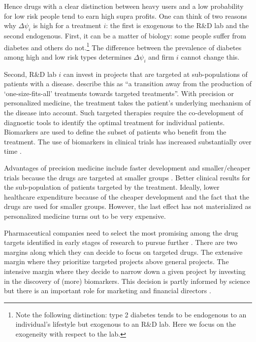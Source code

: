 \documentclass[a4paper,12pt]{article}
\begin{document}
Hence drugs with a clear distinction between heavy users and a low probability for low risk people tend to earn high supra profits. One can think of two reasons why \(\Delta \psi_i\) is high for a treatment \(i\): the first is exogenous to the R\&D lab and the second endogenous. First, it can be a matter of biology: some people suffer from diabetes and others do not.\footnote{Note the following distinction: type 2 diabetes tends to be endogenous to an individual's lifestyle but exogenous to an R\&D lab. Here we focus on the exogeneity with respect to the lab.} The difference between the prevalence of diabetes among high and low risk types determines \(\Delta \psi_i\) and firm \(i\) cannot change this.

Second, R\&D lab \(i\) can invest in projects that are targeted at sub-populations of patients with a disease. \cite{Dugger2018} describe this as ``a transition away from the production of `one-size-fits-all' treatments towards targeted treatments''. With precision or personalized medicine, the treatment takes the patient's underlying mechanism of the disease into account. Such targeted therapies require the co-development of diagnostic tools to identify the optimal treatment for individual patients. Biomarkers are used to define the subset of patients who benefit from the treatment. The use of biomarkers in clinical trials has increased substantially over time \citep{NBERc13994}.

Advantages of precision medicine include faster development and smaller/cheaper trials because the drugs are targeted at smaller groups \citep{NBERc13994}. Better clinical results for the sub-population of patients targeted by the treatment. Ideally, lower healthcare expenditure because of the cheaper development and the fact that the drugs are used for smaller groups. However, the last effect has not materialized as personalized medicine turns out to be very expensive.

Pharmaceutical companies need to select the most promising among the drug targets identified in early stages of research to pursue further \citep{Emmerich2021,Knowles2003}. There are two margins along which they can decide to focus on targeted drugs. The extensive margin where they prioritize targeted projects above general projects. The intensive margin where they decide to narrow down a given project by investing in the discovery of (more) biomarkers. This decision is partly informed by science but there is an important role for marketing and financial directors \citep{Knowles2003}. 
\end{document}
